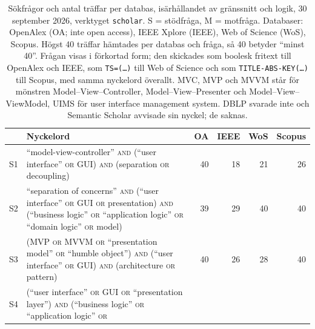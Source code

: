 \begin{table}[htbp]
  \centering
  \caption{Sökfrågor och antal träffar per databas, isärhållandet av
    gränssnitt och logik, 30 september 2026, verktyget
    \texttt{scholar}.  S = stödfråga, M = motfråga.  Databaser: OpenAlex
    (OA; inte \foreignlanguage{english}{open access}), IEEE Xplore
    (IEEE), Web of Science (WoS), Scopus.  Högst 40 träffar hämtades per
    databas och fråga, så 40 betyder \enquote{minst 40}.  Frågan visas
    i förkortad form; den skickades som boolesk fritext till OpenAlex och
    IEEE, som \texttt{TS=(\dots)} till Web of Science och som
    \texttt{TITLE-ABS-KEY(\dots)} till Scopus, med samma nyckelord
    överallt.  MVC, MVP och MVVM står för mönstren Model--View--Controller,
    Model--View--Presenter och Model--View--ViewModel, UIMS för
    \foreignlanguage{english}{user interface management system}.  DBLP
    svarade inte och Semantic Scholar avvisade sin nyckel; de saknas.}
  \label{tab:sok-queries-grafik-separation}
  \footnotesize
  \begin{tabularx}{\linewidth}{@{}l>{\raggedright\arraybackslash}X rrrr@{}}
    \toprule
    & Nyckelord & OA & IEEE & WoS & Scopus \\
    \midrule
    S1 & \enquote{model-view-controller} \textsc{and} (\enquote{user
         interface} \textsc{or} GUI) \textsc{and} (separation
         \textsc{or} decoupling)
       & 40 & 18 & 21 & 26 \\
    S2 & \enquote{separation of concerns} \textsc{and} (\enquote{user
         interface} \textsc{or} GUI \textsc{or} presentation)
         \textsc{and} (\enquote{business logic} \textsc{or}
         \enquote{application logic} \textsc{or} \enquote{domain logic}
         \textsc{or} model)
       & 39 & 29 & 40 & 40 \\
    S3 & (MVP \textsc{or} MVVM \textsc{or} \enquote{presentation model}
         \textsc{or} \enquote{humble object}) \textsc{and} (\enquote{user
         interface} \textsc{or} GUI) \textsc{and} (architecture
         \textsc{or} pattern)
       & 40 & 26 & 28 & 40 \\
    S4 & (\enquote{user interface} \textsc{or} GUI \textsc{or}
         \enquote{presentation layer}) \textsc{and} (\enquote{business
         logic} \textsc{or} \enquote{application logic} \textsc{or}

\end{tabularx}
\end{table}
